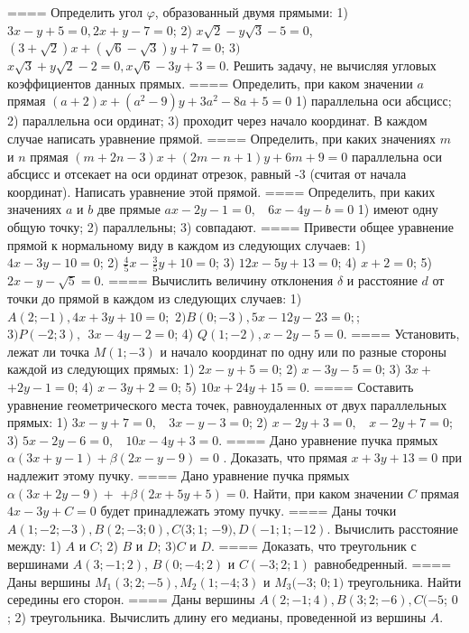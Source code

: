 ====
Определить угол \(\varphi\), образованный двумя прямыми: 1) \(3x - y + 5 = 0,2x + y - 7 = 0\); 2) \(x\sqrt{2} - y\sqrt{3} - 5 = 0\), \((3 + \sqrt{2})x + (\sqrt{6} - \sqrt{3})y + 7 = 0\); \(3)\) \(x\sqrt{3} + y\sqrt{2} - 2 = 0,x\sqrt{6} - 3y + 3 = 0\). Решить задачу, не вычисляя угловых коэффициентов данных прямых.
====
Определить, при каком значении \(a\) прямая \((a + 2)x + \left( a^{2} - 9 \right)y + 3a^{2} - 8a + 5 = 0\) 1) параллельна оси абсцисс; 2) параллельна оси ординат; 3) проходит через начало координат. В каждом случае написать уравнение прямой.
====
Определить, при каких значениях \(m\) и \(n\) прямая \((m + 2n - 3)x + (2m - n + 1)y + 6m + 9 = 0\) параллельна оси абсцисс и отсекает на оси ординат отрезок, равный -3 (считая от начала координат). Написать уравнение этой прямой.
====
Определить, при каких значениях \(a\) и \(b\) две прямые \(ax - 2y - 1 = 0,\ \ \ \ 6x - 4y - b = 0\) 1) имеют одну общую точку; 2) параллельны; 3) совпадают.
====
Привести общее уравнение прямой к нормальному виду в каждом из следующих случаев: 1) \(4x - 3y - 10 = 0\); 2) \(\frac{4}{5}x - \frac{3}{5}y + 10 = 0\); 3) \(12x - 5y + 13 = 0\); 4) \(x + 2 = 0\); 5) \(2x - y - \sqrt{5} = 0\).
====
Вычислить величину отклонения \(\delta\) и расстояние \(d\) от точки до прямой в каждом из следующих случаев: 1) \(A(2; - 1),4x + 3y + 10 = 0;\) \(2)B(0; - 3),5x - 12y - 23 = 0;\); \(3)P( - 2;3),\ \ 3x - 4y - 2 = 0\); 4) \(Q(1; - 2),x - 2y - 5 = 0\).
====
Установить, лежат ли точка \(M(1; - 3)\) и начало координат по одну или по разные стороны каждой из следующих прямых: 1) \(2x - y + 5 = 0\); 2) \(x - 3y - 5 = 0\); 3) \(3x +\) \(+ 2y - 1 = 0\); 4) \(x - 3y + 2 = 0\); 5) \(10x + 24y + 15 = 0\).
====
Составить уравнение геометрического места точек, равноудаленных от двух параллельных прямых: 1) \(3x - y + 7 = 0,\ \ \ \ 3x - y - 3 = 0\); 2) \(x - 2y + 3 = 0,\ \ \ \ x - 2y + 7 = 0\); 3) \(5x - 2y - 6 = 0,\ \ \ \ 10x - 4y + 3 = 0\).
====
Дано уравнение пучка прямых \(\alpha(3x + y - 1) + \beta(2x - y - 9) = 0\) . Доказать, что прямая \(x + 3y + 13 = 0\) при надлежит этому пучку.
====
Дано уравнение пучка прямых \(\alpha(3x + 2y - 9) +\) \(+ \beta(2x + 5y + 5) = 0\). Найти, при каком значении \(C\) прямая \(4x - 3y + C = 0\) будет принадлежать этому пучку.
====
Даны точки \(A(1; - 2; - 3),B(2; - 3;0),C(3;1\); \(- 9),D( - 1;1; - 12)\). Вычислить расстояние между: 1) \(A\) и \(C\); 2) \(B\) и \(D\); 3\()C\) и \(D\).
====
Доказать, что треугольник с вершинами \(A(3; - 1;2)\), \(B(0; - 4;2)\) и \(C( - 3;2;1)\) равнобедренный.
====
Даны вершины \(M_{1}(3;2; - 5),M_{2}(1; - 4;3)\) и \(M_{3}( - 3\); \(0;1)\) треугольника. Найти середины его сторон.
====
Даны вершины \(A(2; - 1;4),B(3;2; - 6),C( - 5\); 0 ; 2) треугольника. Вычислить длину его медианы, проведенной из вершины \(A\).